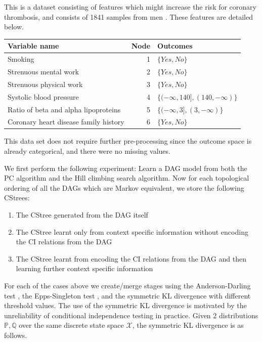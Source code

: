 \documentclass{tufte-book}
\begin{document}
\begin{Definition}
This is a dataset consisting of features which might increase the risk for coronary thrombosis, and consists of 1841 samples from men \cite{reinis-1981-progn-signif}.  These features are detailed below.
\begin{center}
\begin{tabular}{l|r|l}
\hline
Variable name & Node & Outcomes\\
\hline
Smoking & 1 & \(\{ Yes,No \}\)\\
Strenuous mental work & 2 & \(\{ Yes,No \}\)\\
Strenuous physical work & 3 & \(\{ Yes,No \}\)\\
Systolic blood pressure & 4 & \(\{(-\infty,140],(140,-\infty)\}\)\\
Ratio of beta and alpha lipoproteins & 5 & \(\{(-\infty,3],(3,-\infty)\}\)\\
Coronary heart disease family history & 6 & \(\{ Yes,No \}\)\\
\end{tabular}
\end{center}


This data set does not require further pre-processing since the outcome space is already categorical, and there were no missing values.


We first perform the following experiment: Learn a DAG model from both the PC algorithm and the Hill climbing search algorithm. Now for each topological ordering of all the DAGs which are Markov equivalent, we store the following CStrees:
\begin{enumerate}
\item The CStree generated from the DAG itself
\item The CStree learnt only from context specific information without encoding the CI relations from the DAG
\item The CStree learnt from encoding the CI relations from the DAG and then learning further context specific information
\end{enumerate}

For each of the cases above we create/merge stages using the Anderson-Darling test \cite{scholz-1987-k-sampl}, the Epps-Singleton test \cite{epps-1986-omnib-test}, and the symmetric KL divergence with different threshold values. The use of the symmetric KL divergence is motivated by the unreliability of conditional independence testing in practice. Given 2 distributions \(\mathbb{P}, \mathbb{Q}\) over the same discrete state space \(\mathcal{X}\), the symmetric KL divergence is as follows. 




\end{Definition}
\end{document}
